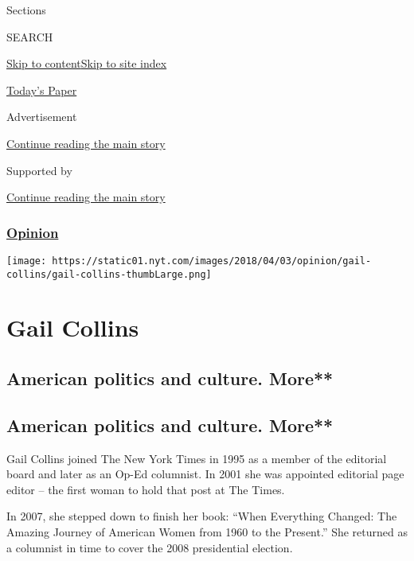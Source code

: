 Sections

SEARCH

\protect\hyperlink{site-content}{Skip to
content}\protect\hyperlink{site-index}{Skip to site index}

\href{https://myaccount.nytimes.com/auth/login?response_type=cookie\&client_id=vi}{}

\href{https://www.nytimes.com/section/todayspaper}{Today's Paper}

Advertisement

\protect\hyperlink{after-top}{Continue reading the main story}

Supported by

\protect\hyperlink{after-sponsor}{Continue reading the main story}

\hypertarget{opinion}{%
\subsubsection{\texorpdfstring{\href{/section/opinion}{Opinion}}{Opinion}}\label{opinion}}

\texttt{[image: https://static01.nyt.com/images/2018/04/03/opinion/gail-collins/gail-collins-thumbLarge.png]}

\hypertarget{gail-collins}{%
\section{Gail Collins}\label{gail-collins}}

\hypertarget{american-politics-and-culture-more}{%
\subsection{American politics and culture.
More**}\label{american-politics-and-culture-more}}

\hypertarget{american-politics-and-culture-more-1}{%
\subsection{American politics and culture.
More**}\label{american-politics-and-culture-more-1}}

Gail Collins joined The New York Times in 1995 as a member of the
editorial board and later as an Op-Ed columnist. In 2001 she was
appointed editorial page editor -- the first woman to hold that post at
The Times.

In 2007, she stepped down to finish her book: ``When Everything Changed:
The Amazing Journey of American Women from 1960 to the Present.'' She
returned as a columnist in time to cover the 2008 presidential election.

